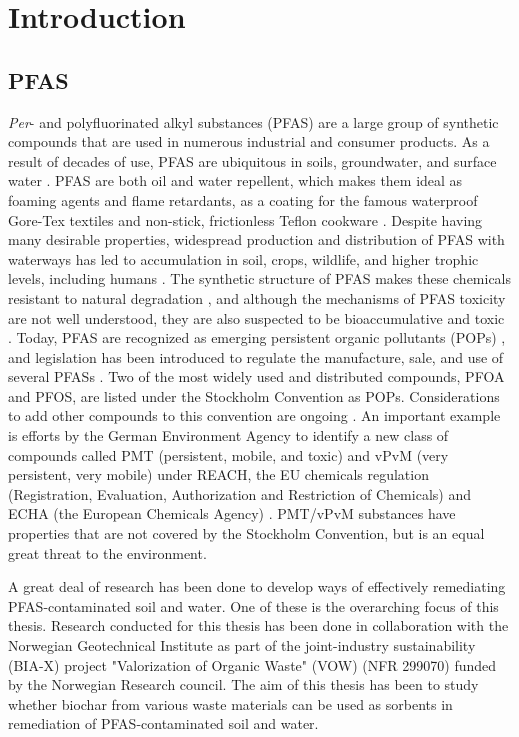 \chapter{Introduction}\label{chap:intro}

\section{PFAS}
\textit{Per}- and polyfluorinated alkyl substances (PFAS) are a large group of synthetic compounds that are used in numerous industrial and consumer products. As a result of decades of use, PFAS are ubiquitous in soils, groundwater, and surface water \citep{rankin2016north}. PFAS are both oil and water repellent, which makes them ideal as foaming agents and flame retardants, as a coating for the famous waterproof Gore-Tex\textsuperscript{\textregistered} textiles and non-stick, frictionless Teflon\textsuperscript{\texttrademark} cookware \citep{du2014adsorption}. Despite having many desirable properties, widespread production and distribution of PFAS with waterways has led to accumulation in soil, crops, wildlife, and higher trophic levels, including humans \citep{bhhatarai2011,Lau2007}. The synthetic structure of PFAS makes these chemicals resistant to natural degradation \citep{krafft2015per}, and although the mechanisms of PFAS toxicity are not well understood, they are also suspected to be bioaccumulative and toxic \citep{ding2013physicochemical,Lau2007}. Today, PFAS are recognized as emerging persistent organic pollutants (POPs) \citep{ECHA2020}, and legislation has been introduced to regulate the manufacture, sale, and use of several PFASs \citep{EPA2014,EC2020PFAS,goldenman2017study}. Two of the most widely used and distributed compounds, PFOA and PFOS, are listed under the Stockholm Convention as POPs. Considerations to add other compounds to this convention are ongoing \citep{EC2020PFAS}. An important example is efforts by the German Environment Agency to identify a new class of compounds called PMT (persistent, mobile, and toxic) and vPvM (very persistent, very mobile) under REACH, the EU chemicals regulation (Registration, Evaluation, Authorization and Restriction of Chemicals) and ECHA (the European Chemicals Agency) \citep{hale2020persistent}. PMT/vPvM substances have properties that are not covered by the Stockholm Convention, but is an equal great threat to the environment. 

A great deal of research has been done to develop ways of effectively remediating PFAS-contaminated soil and water. One of these is the overarching focus of this thesis. Research conducted for this thesis has been done in collaboration with the Norwegian Geotechnical Institute as part of the joint-industry sustainability (BIA-X) project "Valorization of Organic Waste" (VOW) (NFR 299070) funded by the Norwegian Research council. The aim of this thesis has been to study whether biochar from various waste materials can be used as sorbents in remediation of PFAS-contaminated soil and water.

